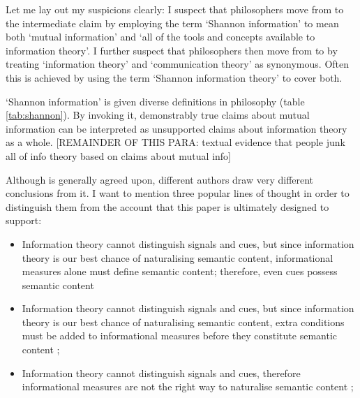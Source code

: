 Let me lay out my suspicions clearly: I suspect that philosophers move from \ami{} to the intermediate claim \ait{} by employing the term `Shannon information' to mean both `mutual information' and `all of the tools and concepts available to information theory'.
I further suspect that philosophers then move from \ait{} to \act{} by treating `information theory' and `communication theory' as synonymous.
Often this is achieved by using the term `Shannon information theory' to cover both.

`Shannon information' is given diverse definitions in philosophy (table \ref{tab:shannon}).
By invoking it, demonstrably true claims about mutual information can be interpreted as unsupported claims about information theory as a whole.
[REMAINDER OF THIS PARA: textual evidence that people junk all of info theory based on claims about mutual info]





Although \ait{} is generally agreed upon, different authors draw very different conclusions from it.
I want to mention three popular lines of thought in order to distinguish them from the account that this paper is ultimately designed to support:

\begin{itemize}
    \item Information theory cannot distinguish signals and cues, but since information theory is our best chance of naturalising semantic content, informational measures alone must define semantic content; therefore, even cues possess semantic content \citep{skyrms2010signals,isaac2018semantics}
    \item Information theory cannot distinguish signals and cues, but since information theory is our best chance of naturalising semantic content, extra conditions must be added to informational measures before they constitute semantic content \citep[$\S$3-4]{shea2018representation}; \citep[pp. 6-9,34-36]{neander2017mark}
    \item Information theory cannot distinguish signals and cues, therefore informational measures are not the right way to naturalise semantic content \citep{lean2014shannon}; \citep[$\S$4]{hutto2017evolving} 
\end{itemize}

